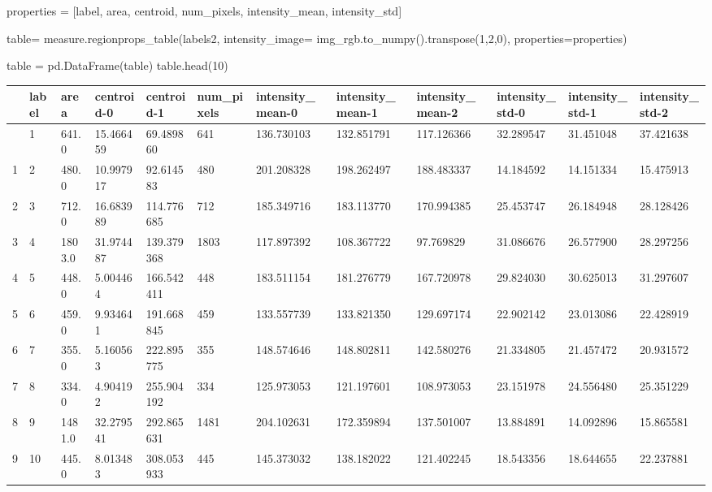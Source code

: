 \documentclass[
  11pt,
  letterpaper,
  open=any,
  twoside=false,
  french]{scrbook}
\newenvironment{Shaded}{\begin{snugshade}}{\end{snugshade}}
\newcommand{\DecValTok}[1]{\textcolor[rgb]{0.68,0.00,0.00}{#1}}
\newcommand{\NormalTok}[1]{\textcolor[rgb]{0.00,0.23,0.31}{#1}}
\newcommand{\OperatorTok}[1]{\textcolor[rgb]{0.37,0.37,0.37}{#1}}
\newcommand{\StringTok}[1]{\textcolor[rgb]{0.13,0.47,0.30}{#1}}
\begin{document}
\begin{Shaded}
\begin{Highlighting}[]
\NormalTok{properties }\OperatorTok{=}\NormalTok{ [}\StringTok{\textquotesingle{}label\textquotesingle{}}\NormalTok{, }\StringTok{\textquotesingle{}area\textquotesingle{}}\NormalTok{, }\StringTok{\textquotesingle{}centroid\textquotesingle{}}\NormalTok{, }\StringTok{\textquotesingle{}num\_pixels\textquotesingle{}}\NormalTok{, }\StringTok{\textquotesingle{}intensity\_mean\textquotesingle{}}\NormalTok{, }\StringTok{\textquotesingle{}intensity\_std\textquotesingle{}}\NormalTok{]}

\NormalTok{table}\OperatorTok{=}\NormalTok{   measure.regionprops\_table(labels2, intensity\_image}\OperatorTok{=}\NormalTok{ img\_rgb.to\_numpy().transpose(}\DecValTok{1}\NormalTok{,}\DecValTok{2}\NormalTok{,}\DecValTok{0}\NormalTok{), properties}\OperatorTok{=}\NormalTok{properties)}

\NormalTok{table }\OperatorTok{=}\NormalTok{ pd.DataFrame(table)}
\NormalTok{table.head(}\DecValTok{10}\NormalTok{)}
\end{Highlighting}
\end{Shaded}

\begin{longtable}[]{@{}llllllllllll@{}}
\toprule\noalign{}
& label & area & centroid-0 & centroid-1 & num\_pixels &
intensity\_mean-0 & intensity\_mean-1 & intensity\_mean-2 &
intensity\_std-0 & intensity\_std-1 & intensity\_std-2 \\
\midrule\noalign{}
\endhead
\bottomrule\noalign{}
\endlastfoot
0 & 1 & 641.0 & 15.466459 & 69.489860 & 641 & 136.730103 & 132.851791 &
117.126366 & 32.289547 & 31.451048 & 37.421638 \\
1 & 2 & 480.0 & 10.997917 & 92.614583 & 480 & 201.208328 & 198.262497 &
188.483337 & 14.184592 & 14.151334 & 15.475913 \\
2 & 3 & 712.0 & 16.683989 & 114.776685 & 712 & 185.349716 & 183.113770 &
170.994385 & 25.453747 & 26.184948 & 28.128426 \\
3 & 4 & 1803.0 & 31.974487 & 139.379368 & 1803 & 117.897392 & 108.367722
& 97.769829 & 31.086676 & 26.577900 & 28.297256 \\
4 & 5 & 448.0 & 5.004464 & 166.542411 & 448 & 183.511154 & 181.276779 &
167.720978 & 29.824030 & 30.625013 & 31.297607 \\
5 & 6 & 459.0 & 9.934641 & 191.668845 & 459 & 133.557739 & 133.821350 &
129.697174 & 22.902142 & 23.013086 & 22.428919 \\
6 & 7 & 355.0 & 5.160563 & 222.895775 & 355 & 148.574646 & 148.802811 &
142.580276 & 21.334805 & 21.457472 & 20.931572 \\
7 & 8 & 334.0 & 4.904192 & 255.904192 & 334 & 125.973053 & 121.197601 &
108.973053 & 23.151978 & 24.556480 & 25.351229 \\
8 & 9 & 1481.0 & 32.279541 & 292.865631 & 1481 & 204.102631 & 172.359894
& 137.501007 & 13.884891 & 14.092896 & 15.865581 \\
9 & 10 & 445.0 & 8.013483 & 308.053933 & 445 & 145.373032 & 138.182022 &
121.402245 & 18.543356 & 18.644655 & 22.237881 \\
\end{longtable}
\end{document}
